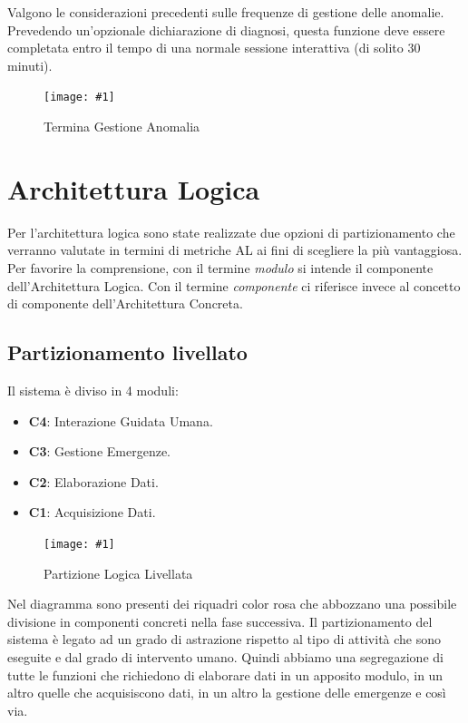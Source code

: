 \documentclass[a4paper,11pt,oneside, table]{article}
\newcommand{\putimage}[4] {
	\begin{figure}[H]
	    \centering
	    \texttt{[image: \#1]}
	    \caption{#2}\label{#3}
	\end{figure}
}
\newcommand{\bigimage}[4] {
	\begin{figure}[H]
	    \centering
	    \texttt{[image: \#1]}
	    \caption{#2}\label{#3}
	\end{figure}
}
\begin{document}
Valgono le considerazioni precedenti sulle frequenze di gestione delle anomalie.
Prevedendo un'opzionale dichiarazione di diagnosi, questa funzione deve essere completata entro il tempo di una normale sessione interattiva (di solito 30 minuti).

\putimage{images/Diagramma delle Attivita'/Termina Gestione Anomalia.png}{Termina Gestione Anomalia}{png:act:termina-gestione-anomalia}{1}

\section{Architettura Logica}

Per l'architettura logica sono state realizzate due opzioni di partizionamento che verranno valutate in termini di metriche AL ai fini di scegliere la pi\`u vantaggiosa.
Per favorire la comprensione, con il termine \textit{modulo} si intende il componente dell'Architettura Logica. Con il termine \textit{componente} ci riferisce invece al concetto di componente dell'Architettura Concreta.

\subsection{Partizionamento livellato}

Il sistema \`e diviso in 4 moduli:
\begin{itemize}
  \item \textbf{C4}: Interazione Guidata Umana.
  \item \textbf{C3}: Gestione Emergenze.
  \item \textbf{C2}: Elaborazione Dati.
  \item \textbf{C1}: Acquisizione Dati.
\end{itemize}

\bigimage{images/Diagramma delle Attivita'/Partizione Logica Livellata.png}{Partizione Logica Livellata}{png:act:partizione-logica-livellata}{1}

Nel diagramma sono presenti dei riquadri color rosa che abbozzano una possibile divisione in componenti concreti nella fase successiva.
Il partizionamento del sistema \`e legato ad un grado di astrazione rispetto al tipo di attivit\`a che sono eseguite e dal grado di intervento umano. Quindi abbiamo una segregazione di tutte le funzioni che richiedono di elaborare dati in un apposito modulo, in un altro quelle che acquisiscono dati, in un altro la gestione delle emergenze e cos\`i via.
\end{document}
